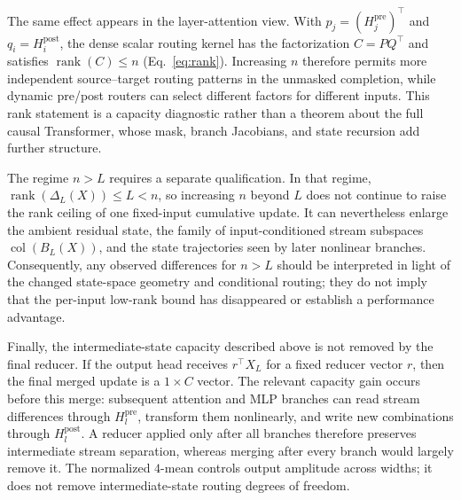 \documentclass{article}
\newcommand{\Hpre}{H^{\mathrm{pre}}}
\newcommand{\Hpost}{H^{\mathrm{post}}}
\begin{document}
The same effect appears in the layer-attention view. With
$p_j=(\Hpre_j)^\top$ and $q_i=\Hpost_i$, the dense scalar routing kernel has
the factorization $C=PQ^\top$ and satisfies $\operatorname{rank}(C)\leq n$
(Eq.~\ref{eq:rank}). Increasing $n$ therefore permits more independent
source--target routing patterns in the unmasked completion, while dynamic
pre/post routers can select different factors for different inputs. This rank
statement is a capacity diagnostic rather than a theorem about the full causal
Transformer, whose mask, branch Jacobians, and state recursion add further
structure.

The regime $n>L$ requires a separate qualification. In that regime,
$\operatorname{rank}(\Delta_L(X))\leq L<n$, so increasing $n$ beyond $L$ does
not continue to raise the rank ceiling of one fixed-input cumulative update. It
can nevertheless enlarge the ambient residual state, the family of
input-conditioned stream subspaces $\operatorname{col}(B_L(X))$, and the state
trajectories seen by later nonlinear branches. Consequently, any observed
differences for $n>L$ should be interpreted in light of the changed state-space
geometry and conditional routing; they do not imply that the per-input
low-rank bound has disappeared or establish a performance advantage.

Finally, the intermediate-state capacity described above is not removed by the
final reducer. If
the output head receives $r^\top X_L$ for a fixed reducer vector $r$, then the
final merged update is a $1\times C$ vector. The relevant capacity gain occurs
before this merge: subsequent attention and MLP branches can read stream
differences through $\Hpre_l$, transform them nonlinearly, and write new
combinations through $\Hpost_l$. A reducer applied only after all branches
therefore preserves intermediate stream separation, whereas merging after
every branch would largely remove it. The normalized $4$-mean controls output
amplitude across widths; it does not remove intermediate-state routing degrees
of freedom.
\end{document}
